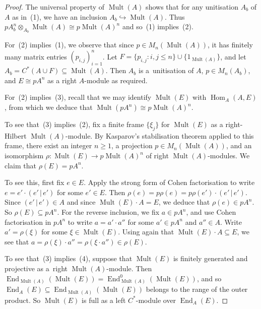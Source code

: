 \documentclass[10pt,a4paper]{amsart}
\numberwithin{equation}{section}
\DeclareMathOperator{\End}{End} %
\DeclareMathOperator{\Mult}{Mult} %
\newcommand{\ox}{\otimes} %
\begin{document}
\begin{proof}
The universal property of $\Mult(A)$ shows that for any unitisation $A_b$ of $A$ as in~(1), we have an inclusion $A_b\hookrightarrow\Mult(A)$. Thus $pA_b^n\ox_{A_b}\Mult(A)\cong p\Mult(A)^n$ and so~(1) implies~(2).

For~(2) implies~(1), we observe that since $p \in M_n(\Mult(A))$, it has f\/initely many matrix entries $(p_{i,j})^n_{i=1}$. Let $F = \{p_{i,j} \colon i,j \le n\} \cup \{1_{\Mult(A)}\}$, and let $A_b = C^*(A \cup F) \subseteq \Mult(A)$. Then $A_b$ is a~unitisation of $A$, $p \in M_n(A_b)$, and $E \cong p A^n$ as a right $A$-module as required.

For~(2) implies~(3), recall that we may identify $\Mult(E)$ with $\operatorname{Hom}_A(A,E)$, from which we deduce that $\Mult(pA^n)\cong p\Mult(A)^n$.

To see that~(3) implies~(2), f\/ix a f\/inite frame $\{\xi_j\}$ for $\Mult(E)$ as a right-Hilbert $\Mult(A)$-module. By Kasparov's stabilisation theorem applied to this frame, there exist an integer $n \ge 1$, a projection $p \in M_n(\Mult(A))$, and an isomorphism $\rho \colon \Mult(E) \to p\Mult(A)^n$ of right $\Mult(A)$-modules. We claim that $\rho(E) = pA^n$.

To see this, f\/irst f\/ix $e \in E$. Apply the strong form \cite[Proposition~2.31]{tfb} of Cohen factorisation to write $e = e' \cdot (e' \,|\, e')$ for some $e' \in E$. Then $\rho(e) = p \rho(e) = p \rho(e') \cdot(e' \,|\, e')$. Since $(e' \,|\, e') \in A$ and since $\Mult(E) \cdot A = E$, we deduce that $\rho(e) \in p A^n$. So $\rho(E) \subseteq pA^n$. For the reverse inclusion, we f\/ix $a \in p A^n$, and use Cohen factorisation in $p
A^n$ to write $a = a' \cdot a''$ for some $a' \in pA^n$ and $a'' \in A$. Write $a' = \rho(\xi)$ for some $\xi \in \Mult(E)$. Using again that $\Mult(E)\cdot A \subseteq E$, we see that $a = \rho(\xi)\cdot a'' = \rho(\xi \cdot a'') \in \rho(E)$.

To see that~(3) implies~(4), suppose that $\Mult(E)$ is f\/initely generated and projective as a~right $\Mult(A)$-module. Then $\End_{\Mult(A)}(\Mult(E)) = \End_{\Mult(A)}^0(\Mult(E))$, and so $\End_A(E) \subseteq \End_{\Mult(A)}(\Mult(E))$ belongs to the range of the outer product. So $\Mult(E)$ is full as a left $C^*$-module over $\End_A(E)$.


\end{proof}
\end{document}
